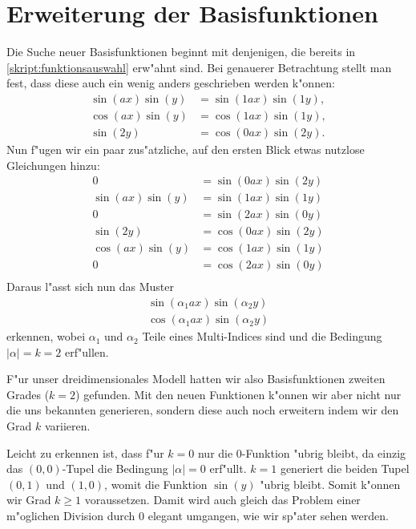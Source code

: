 \section{Erweiterung der Basisfunktionen\label{section:lorenz2:basic_function}}
Die Suche neuer Basisfunktionen beginnt mit denjenigen, die bereits 
in \cref{skript:funktionsauswahl} erw"ahnt sind. Bei genauerer Betrachtung 
stellt man fest, dass diese auch ein wenig anders geschrieben werden k"onnen:
\begin{align*}
\sin(ax)\sin(y) &= \sin(1ax)\sin(1y),\\
\cos(ax)\sin(y) &= \cos(1ax)\sin(1y),\\
\sin(2y) &= \cos(0ax)\sin(2y).
\end{align*}
Nun f"ugen wir ein paar zus"atzliche, auf den ersten Blick etwas nutzlose 
Gleichungen hinzu:
\begin{align*}
0 &= \sin(0ax)\sin(2y) \\
\sin(ax)\sin(y) &= \sin(1ax)\sin(1y)\\
0 &= \sin(2ax)\sin(0y) \\
\sin(2y) &= \cos(0ax)\sin(2y)\\
\cos(ax)\sin(y) &= \cos(1ax)\sin(1y)\\
0 &= \cos(2ax)\sin(0y)\\
\end{align*}
Daraus l"asst sich nun das Muster
\begin{equation}
\begin{split}
\sin(\alpha_1 ax)\sin(\alpha_2 y) \\
\cos(\alpha_1 ax)\sin(\alpha_2 y)
\end{split}
\label{equation:lorenz2:basic-functions}
\end{equation}
erkennen, wobei $\alpha_1$ und $\alpha_2$ Teile eines Multi-Indices sind und 
die Bedingung $|\alpha| = k = 2$ erf"ullen.

F"ur unser dreidimensionales Modell hatten wir also Basisfunktionen zweiten 
Grades ($k = 2$) gefunden. Mit den neuen Funktionen k"onnen wir aber nicht nur 
die uns bekannten generieren, sondern diese auch noch erweitern indem wir den 
Grad $k$ variieren.

Leicht zu erkennen ist, dass f"ur $k = 0$ nur die $0$-Funktion 
"ubrig bleibt, da einzig das $(0, 0)$-Tupel die Bedingung $|\alpha| = 0$ 
erf"ullt. $k = 1$ generiert die beiden Tupel $(0, 1)$ und $(1, 0)$, womit die 
Funktion $\sin(y)$ "ubrig bleibt. Somit k"onnen wir Grad $k \geq 1$ 
voraussetzen. Damit wird auch gleich das Problem einer m"oglichen Division 
durch $0$ elegant umgangen, wie wir sp"ater sehen werden.
